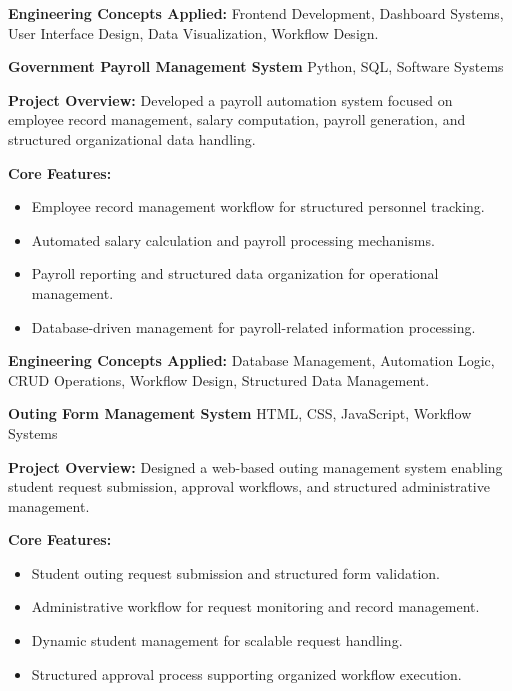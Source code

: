 \documentclass[a4paper,11pt]{article}
\newcommand{\resumeProject}[2]{
\textbf{#1} \hfill {\small #2}
}
\begin{document}
\textbf{Engineering Concepts Applied:}
Frontend Development, Dashboard Systems, User Interface Design, Data Visualization, Workflow Design.

\vspace{4pt}

\resumeProject
{Government Payroll Management System}
{Python, SQL, Software Systems}

\textbf{Project Overview:}
Developed a payroll automation system focused on employee record management, salary computation, payroll generation, and structured organizational data handling.

\textbf{Core Features:}
\begin{itemize}
    \item Employee record management workflow for structured personnel tracking.
    
    \item Automated salary calculation and payroll processing mechanisms.
    
    \item Payroll reporting and structured data organization for operational management.
    
    \item Database-driven management for payroll-related information processing.
\end{itemize}

\textbf{Engineering Concepts Applied:}
Database Management, Automation Logic, CRUD Operations, Workflow Design, Structured Data Management.

\vspace{4pt}

\resumeProject
{Outing Form Management System}
{HTML, CSS, JavaScript, Workflow Systems}

\textbf{Project Overview:}
Designed a web-based outing management system enabling student request submission, approval workflows, and structured administrative management.

\textbf{Core Features:}
\begin{itemize}
    \item Student outing request submission and structured form validation.
    
    \item Administrative workflow for request monitoring and record management.
    
    \item Dynamic student management for scalable request handling.
    
    \item Structured approval process supporting organized workflow execution.
\end{itemize}
\end{document}
